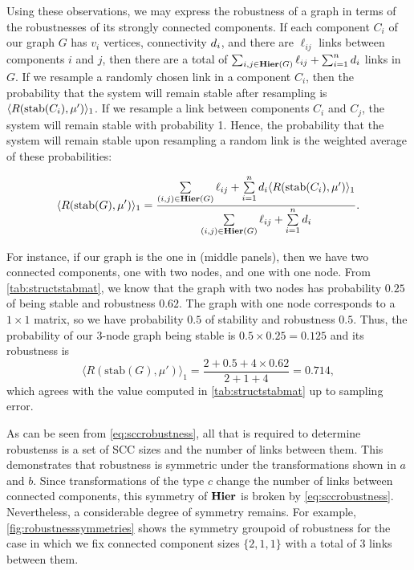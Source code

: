 Using these observations, we may express the robustness of a graph in
terms of the robustnesses of its strongly connected components.  If
each component $C_i$ of our graph $G$ has $v_i$ vertices, connectivity
$d_i$, and there are $\ell_{ij}$ links between components
$i$ and $j$, then there are a total of
$\sum_{i,j \in \mathbf{Hier}(G)} \ell_{ij} + \sum_{i=1}^n d_i$
links in $G$.  If we resample a randomly chosen link in a component
$C_i$, then the probability that the system will remain stable after
resampling is $\langle R(\hbox{stab} (C_i), \mu') \rangle_1$.  If we resample a link
between components $C_i$ and $C_j$, the system will remain stable with
probability 1.  Hence, the probability that the system will remain
stable upon resampling a random link is the weighted average of these
probabilities:
\begin{widetext}
\begin{align}\label{eq:sccrobustness}
\langle R(\hbox{stab} (G), \mu') \rangle_1 =
\frac{\sum\limits_{(i,j) \in \mathbf{Hier}(G)} \ell_{ij} +
      \sum\limits_{i=1}^n d_i \langle R(\textrm{stab}(C_i),\mu') \rangle_1}
     {\sum\limits_{(i,j) \in \mathbf{Hier}(G)} \ell_{ij} +
      \sum\limits_{i=1}^n d_i}.
\end{align}
\end{widetext}
For instance, if our graph is the one in  (middle panels), then we have two connected components, one with two nodes, and one with one node.  From \ref{tab:structstabmat}, we know that the graph with two nodes has probability $0.25$ of being stable and robustness $0.62$.  The graph with one node corresponds to a $1 \times 1$ matrix, so we have probability $0.5$ of stability and robustness $0.5$.  Thus, the probability of our 3-node graph being stable is $0.5 \times 0.25 = 0.125$ and its robustness is
\[
\langle R(\textrm{stab}(G),\mu') \rangle_1 = \frac{2 + 0.5 + 4 \times 0.62}{2 + 1 + 4} = 0.714,
\]
which agrees with the value computed in \ref{tab:structstabmat} up to
sampling error.

As can be seen from \ref{eq:sccrobustness}, all that is required to determine robustenss is a set of SCC sizes and the number of links between them. This demonstrates that robustness is symmetric under the transformations shown in  $a$ and $b$. Since transformations of the type  $c$ change the number of links between connected components, this symmetry of $\mathbf{Hier}$ is broken by \ref{eq:sccrobustness}. Nevertheless, a considerable degree of symmetry remains. For example, \ref{fig:robustnesssymmetries} shows the symmetry groupoid of robustness for the case in which we fix connected component sizes $\{2,1,1\}$ with a total of $3$ links between them.

